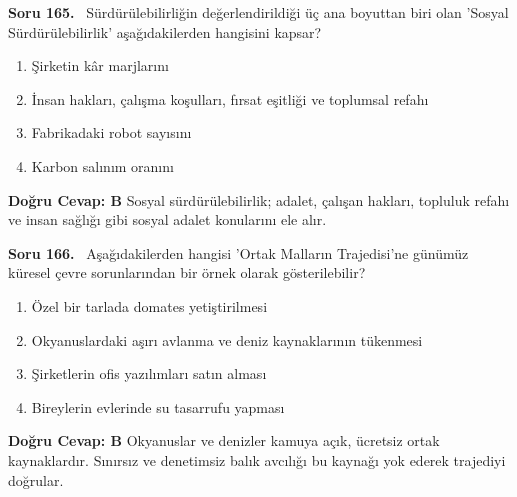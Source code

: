 \documentclass[11pt,a4paper,openany]{book}
\begin{document}
\needspace{5cm}
\vspace{8pt}
\noindent\textbf{\large\sffamily Soru 165.} \ Sürdürülebilirliğin değerlendirildiği üç ana boyuttan biri olan 'Sosyal Sürdürülebilirlik' aşağıdakilerden hangisini kapsar?
\begin{enumerate}[label=\Alph*), leftmargin=25pt, topsep=4pt, itemsep=2pt]
    \item Şirketin kâr marjlarını
    \item İnsan hakları, çalışma koşulları, fırsat eşitliği ve toplumsal refahı
    \item Fabrikadaki robot sayısını
    \item Karbon salınım oranını
\end{enumerate}
\vspace{4pt}
\begin{tcolorbox}[title=Cevap ve Açıklama, colback=gray!3!white, colframe=primarycolor!90!black, arc=2mm, fonttitle=\bfseries\sffamily, top=6pt, bottom=6pt]
    \textbf{Doğru Cevap: B}
    \vspace{2pt}
    Sosyal sürdürülebilirlik; adalet, çalışan hakları, topluluk refahı ve insan sağlığı gibi sosyal adalet konularını ele alır.
\end{tcolorbox}
\vspace{10pt}

\needspace{5cm}
\vspace{8pt}
\noindent\textbf{\large\sffamily Soru 166.} \ Aşağıdakilerden hangisi 'Ortak Malların Trajedisi'ne günümüz küresel çevre sorunlarından bir örnek olarak gösterilebilir?
\begin{enumerate}[label=\Alph*), leftmargin=25pt, topsep=4pt, itemsep=2pt]
    \item Özel bir tarlada domates yetiştirilmesi
    \item Okyanuslardaki aşırı avlanma ve deniz kaynaklarının tükenmesi
    \item Şirketlerin ofis yazılımları satın alması
    \item Bireylerin evlerinde su tasarrufu yapması
\end{enumerate}
\vspace{4pt}
\begin{tcolorbox}[title=Cevap ve Açıklama, colback=gray!3!white, colframe=primarycolor!90!black, arc=2mm, fonttitle=\bfseries\sffamily, top=6pt, bottom=6pt]
    \textbf{Doğru Cevap: B}
    \vspace{2pt}
    Okyanuslar ve denizler kamuya açık, ücretsiz ortak kaynaklardır. Sınırsız ve denetimsiz balık avcılığı bu kaynağı yok ederek trajediyi doğrular.
\end{tcolorbox}
\vspace{10pt}
\end{document}
